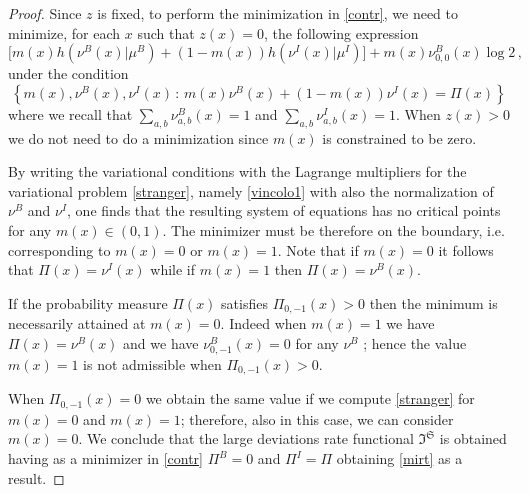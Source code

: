 \documentclass[reqno]{amsart}
\theoremstyle{plain}
\theoremstyle{definition}
\theoremstyle{remark}
\numberwithin{equation}{section}
\numberwithin{theorem}{section}
\newcommand{\<}{\langle}
\renewcommand{\>}{\rangle}
\begin{document}
	\begin{proof}
		Since $z$ is fixed, to perform the minimization in \eqref{contr}, we need to minimize, for each $x$ such that $z(x)=0$, the following expression
		\begin{equation}\label{stranger}
			\Big[m(x)h\left(\nu^B(x)|\mu^B\right)+(1-m(x))h\left(\nu^I(x)|\mu^I\right)\Big]+m(x)\nu^B_{0,0}(x)\log 2\,,
		\end{equation}
		under the condition
		\begin{equation}\label{vincolo1}
			\left\{m(x),\nu^B(x),\nu^I(x)\,:\, m(x)\nu^B(x)+(1-m(x))\nu^I(x)=\Pi(x)\right\}\,
		\end{equation}
		where we recall that $\sum_{a, b}\nu^B_{a, b}(x)=1$ and $\sum_{a, b}\nu^I_{a, b}(x)=1$. When $z(x)>0$ we do not need to do a minimization since $m(x)$ is constrained to be zero.
		
		By writing the variational conditions with the Lagrange multipliers for the variational problem \eqref{stranger}, namely \eqref{vincolo1} with also the normalization of $\nu^B$ and $\nu^I$, one finds that the resulting system of equations has no critical points for any $m(x) \in (0,1)$. The minimizer must be therefore on the boundary, i.e. corresponding to $m(x)=0$ or $m(x)=1$. Note that if $m(x)=0$ it follows that $\Pi(x)=\nu^I(x)$ while if $m(x)=1$ then $\Pi(x)=\nu^B(x)$.
		
		\smallskip
		
		If the probability measure $\Pi(x)$ satisfies $\Pi_{0,-1}(x)>0$ then the minimum is necessarily attained at $m(x)=0$. Indeed when $m(x)=1$ we have $\Pi(x)=\nu^B(x)$ and we have $\nu^B_{0,-1}(x)=0$ for any $\nu^B$ ; hence the value $m(x)=1$ is not admissible when $\Pi_{0,-1}(x)>0$.
		
		When $\Pi_{0,-1}(x)=0$ we obtain the same value if we compute \eqref{stranger} for $m(x)=0$ and $m(x)=1$; therefore, also in this case, we can consider $m(x)=0$. We conclude that the large deviations rate functional $\mathfrak I^{\mathfrak S}$ is obtained having as a minimizer in \eqref{contr} $\Pi^B=0$ and $\Pi^I=\Pi$ obtaining \eqref{mirt} as a result.
	\end{proof}
	
\end{document}
